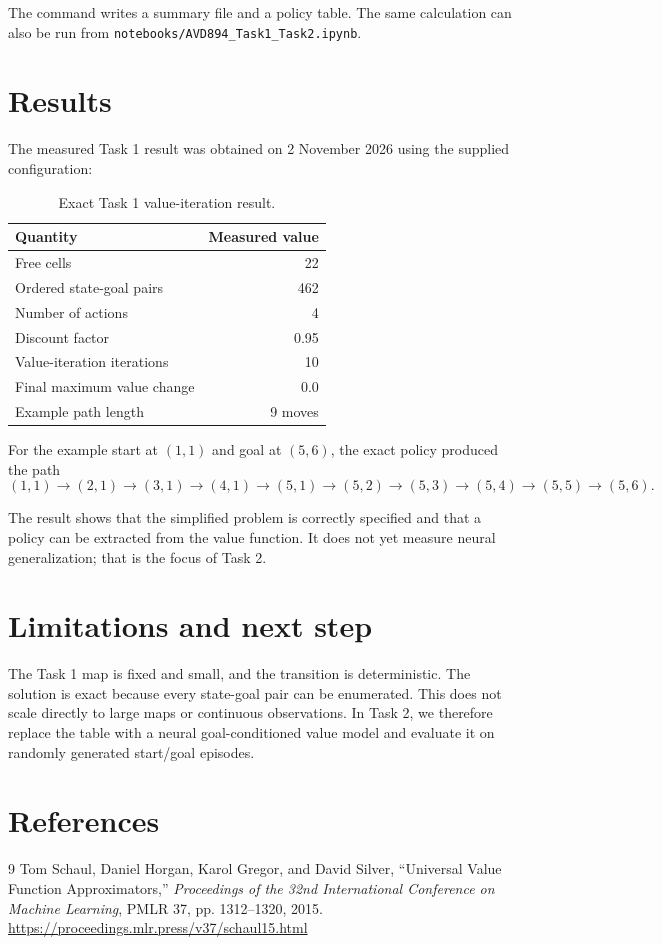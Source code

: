 \documentclass[11pt,a4paper]{article}
\begin{document}
The command writes a summary file and a policy table. The same calculation can
also be run from \texttt{notebooks/AVD894\_Task1\_Task2.ipynb}.

\section{Results}

The measured Task 1 result was obtained on 2 November 2026 using the supplied
configuration:

\begin{table}[h]
\centering
\caption{Exact Task 1 value-iteration result.}
\begin{tabular}{lr}
\toprule
Quantity & Measured value\\
\midrule
Free cells & 22\\
Ordered state-goal pairs & 462\\
Number of actions & 4\\
Discount factor & 0.95\\
Value-iteration iterations & 10\\
Final maximum value change & 0.0\\
Example path length & 9 moves\\
\bottomrule
\end{tabular}
\end{table}

For the example start at $(1,1)$ and goal at $(5,6)$, the exact policy produced
the path
\[
(1,1)\rightarrow(2,1)\rightarrow(3,1)\rightarrow(4,1)
\rightarrow(5,1)\rightarrow(5,2)\rightarrow(5,3)
\rightarrow(5,4)\rightarrow(5,5)\rightarrow(5,6).
\]

The result shows that the simplified problem is correctly specified and that a
policy can be extracted from the value function. It does not yet measure neural
generalization; that is the focus of Task 2.

\section{Limitations and next step}

The Task 1 map is fixed and small, and the transition is deterministic. The
solution is exact because every state-goal pair can be enumerated. This does not
scale directly to large maps or continuous observations. In Task 2, we therefore
replace the table with a neural goal-conditioned value model and evaluate it on
randomly generated start/goal episodes.

\section{References}

\begin{thebibliography}{9}
Tom Schaul, Daniel Horgan, Karol Gregor, and David Silver,
``Universal Value Function Approximators,''
\emph{Proceedings of the 32nd International Conference on Machine Learning},
PMLR 37, pp. 1312--1320, 2015.
\url{https://proceedings.mlr.press/v37/schaul15.html}
\end{thebibliography}
\end{document}
